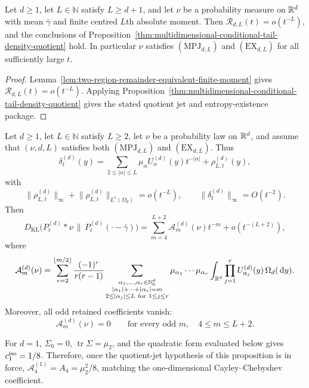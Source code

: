 \begin{theorem}%
\label{thm:multidimensional-density-quotient}
Let \(d\ge1\), let \(L\in\mathbb N\) satisfy \(L\ge d+1\), and let \(\nu\) be
a probability measure on \(\mathbb{R}^d\) with mean \(\bar{\gamma}\) and finite
centred \(L\)th absolute moment.  Then
\(\mathcal R_{d,L}(t)=o(t^{-L})\), and the conclusions of
Proposition~\ref{thm:multidimensional-conditional-tail-density-quotient}
hold.
In particular \(\nu\) satisfies \((\mathrm{MPJ}_{d,L})\) and
\((\mathrm{EX}_{d,L})\) for all sufficiently large \(t\).
\end{theorem}

\begin{proof}
Lemma~\ref{lem:two-region-remainder-equivalent-finite-moment} gives
\(\mathcal R_{d,L}(t)=o(t^{-L})\).  Applying
Proposition~\ref{thm:multidimensional-conditional-tail-density-quotient} gives
the stated quotient jet and entropy-existence package.
\end{proof}

\begin{proposition}%
\label{thm:multidimensional-poisson-entropy-jets}
Let \(d\ge1\), let \(L\in\mathbb N\) satisfy \(L\ge2\), let \(\nu\) be a
probability law on \(\mathbb{R}^d\), and assume that \((\nu,d,L)\) satisfies both
\((\mathrm{MPJ}_{d,L})\) and \((\mathrm{EX}_{d,L})\).  Thus
\[
\delta_t^{(d)}(y)
=\sum_{2\le\lvert\alpha\rvert\le L}
\mu_\alpha U_\alpha^{(d)}(y)t^{-\lvert\alpha\rvert}
+\rho_{L,t}^{(d)}(y),
\]
with
\[
\lVert\rho_{L,t}^{(d)}\rVert_\infty+
\lVert\rho_{L,t}^{(d)}\rVert_{L^1(\Omega_d)}=o(t^{-L}),
\qquad
\lVert\delta_t^{(d)}\rVert_\infty=O(t^{-2}).
\]
Then
\[
D_{\mathrm{KL}}\bigl(P_t^{(d)}*\nu\,\|\,P_t^{(d)}(\cdot-\bar{\gamma})\bigr)
=\sum_{m=4}^{L+2}\mathcal A_m^{(d)}(\nu)t^{-m}
+o(t^{-(L+2)}),
\]
where
\[
\mathcal A_m^{(d)}(\nu)=
\sum_{r=2}^{\lfloor m/2\rfloor}
\frac{(-1)^r}{r(r-1)}
\sum_{\substack{\alpha_1,\ldots,\alpha_r\in\mathbb{N}_0^d\\
|\alpha_1|+\cdots+|\alpha_r|=m\\
2\le|\alpha_j|\le L\ \mathrm{for}\ 1\le j\le r}}
\mu_{\alpha_1}\cdots\mu_{\alpha_r}
\int_{\mathbb{R}^d}\prod_{j=1}^r
U_{\alpha_j}^{(d)}(y)\,\Omega_d(\,\mathrm{d} y).
\]
Moreover, all odd retained coefficients vanish:
\[
\mathcal A_m^{(d)}(\nu)=0
\qquad\text{for every odd }m,\quad 4\le m\le L+2.
\]
\end{proposition}

\begin{remark}
For \(d=1\), \(\Sigma_0=0\), \(\operatorname{tr}\Sigma=\mu_2\), and the
quadratic form evaluated below gives \(c_1^{\rm iso}=1/8\).  Therefore, once
the quotient-jet hypothesis of this proposition is in force,
\(\mathcal A_4^{(1)}=A_4=\mu_2^2/8\), matching the one-dimensional
Cayley--Chebyshev coefficient.
\end{remark}

